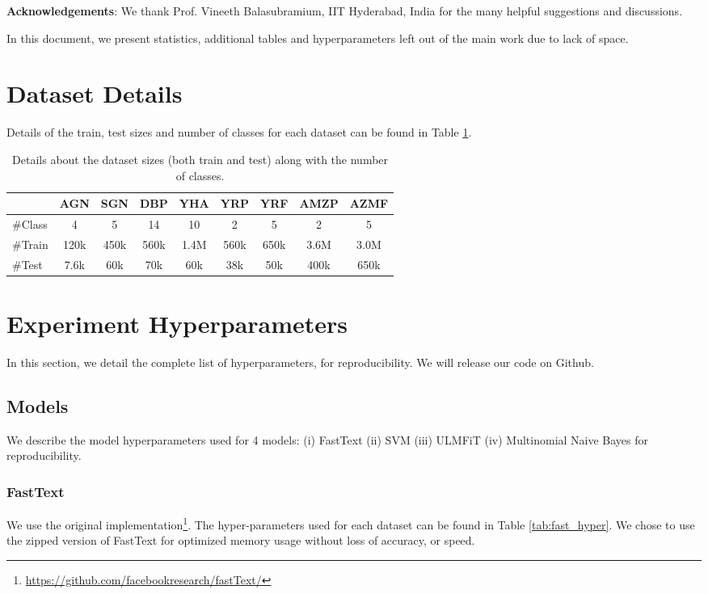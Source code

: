 \documentclass[11pt,a4paper]{article}
\begin{document}
\textbf{Acknowledgements}: We thank Prof. Vineeth Balasubramium, IIT Hyderabad, India for the many helpful suggestions and discussions. 
 \newpage


\clearpage
\appendix
In this document, we present statistics, additional tables and hyperparameters left out of the main work due to lack of space.

\section{Dataset Details}
Details of the train, test sizes and number of classes for each dataset can be found in Table \ref{tab:dataset_details}.
\begin{table}[t]
\centering
\small\addtolength{\tabcolsep}{-3pt}
\begin{tabular}{|l|c|c|c|c|c|c|c|c|}\hline
 & AGN & SGN & DBP & YHA & YRP & YRF & AMZP & AZMF \\ \hline
\#Class & 4 & 5 & 14 & 10 & 2 & 5 & 2 & 5 \\ \hline
\#Train& 120k & 450k & 560k & 1.4M & 560k & 650k & 3.6M & 3.0M\\ \hline
\#Test & 7.6k & 60k & 70k & 60k & 38k & 50k & 400k & 650k\\ \hline
\end{tabular}
\caption{Details about the dataset sizes (both train and test) along with the number of classes.}
\label{tab:dataset_details}
\end{table}


\section{Experiment Hyperparameters}
In this section, we detail the complete list of hyperparameters, for reproducibility. We will release our code on Github.

\subsection{Models}
We describe the model hyperparameters used for 4 models: (i) FastText (ii) SVM (iii) ULMFiT (iv) Multinomial Naive Bayes for reproducibility.
\subsubsection{FastText}
We use the original implementation\footnote{\url{https://github.com/facebookresearch/fastText/}}. The hyper-parameters used for each dataset can be found in Table \ref{tab:fast_hyper}. We chose to use the zipped version of FastText for optimized memory usage without loss of accuracy, or speed.
\end{document}
